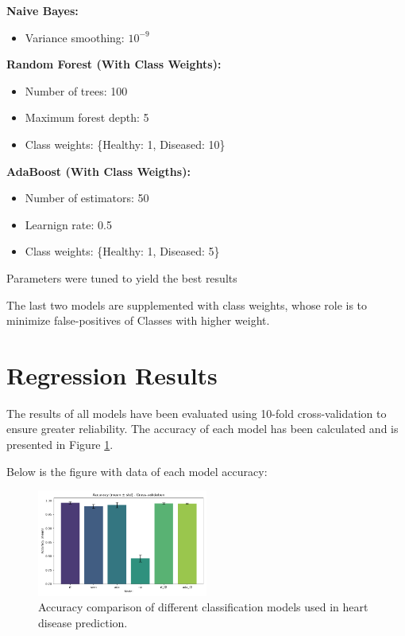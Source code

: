 \documentclass[conference]{IEEEtran}
\begin{document}
\textbf{Naive Bayes:}
\begin{itemize}
    \item Variance smoothing: $10^{-9}$
\end{itemize}

\textbf{Random Forest (With Class Weights):}
\begin{itemize}
    \item Number of trees: 100
    \item Maximum forest depth: 5
    \item Class weights: \{Healthy: 1, Diseased: 10\}
\end{itemize}

\textbf{AdaBoost (With Class Weigths):}
\begin{itemize}
    \item Number of estimators: 50
    \item Learnign rate: 0.5
    \item Class weights: \{Healthy: 1, Diseased: 5\}
\end{itemize}

Parameters were tuned to yield the best results %

The last two models are supplemented with class weights, whose role is to minimize false-positives of Classes with higher weight.




\section{Regression Results}

The results of all models have been evaluated using 10-fold cross-validation to ensure greater reliability.
The accuracy of each model has been calculated and is presented in Figure \ref{fig:accuracy}. 


Below is the figure with data of each model accuracy:
\begin{figure}[H]%
    \centering
    \includegraphics[width=0.5\textwidth]{../src/plots/accuracy_cv_plot.png}
    \caption{Accuracy comparison of different classification models used in heart disease prediction.}
    \label{fig:accuracy}
\end{figure}
\end{document}
